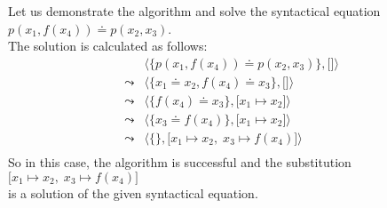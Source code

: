 \example
Let us demonstrate the algorithm and solve the syntactical equation \\[0.2cm]
\hspace*{1.3cm}  $p(x_1, f(x_4)) \doteq p( x_2, x_3)$.  \\[0.2cm]
The solution is calculated as follows:
$$
\begin{array}{ll}
          &  \big\langle \big\{ p(x_1, f(x_4)) \doteq p( x_2, x_3) \big\}, \big[ \big] \big\rangle \\[0.2cm]
 \leadsto &  \big\langle \big\{ x_1 \doteq x_2, f(x_4) \doteq x_3 \big\}, \big[ \big] \big\rangle \\[0.2cm]
 \leadsto &  \big\langle \big\{ f(x_4) \doteq x_3 \big\}, \big[ x_1 \mapsto x_2 \big] \big\rangle \\[0.2cm]
 \leadsto &  \big\langle \big\{ x_3 \doteq f(x_4) \big\}, \big[ x_1 \mapsto x_2 \big] \big\rangle \\[0.2cm]
 \leadsto &  \big\langle \big\{\big\}, \big[ x_1 \mapsto x_2,\; x_3 \mapsto f(x_4) \big] \big\rangle \\[0.2cm]
\end{array}
$$
So in this case, the algorithm is successful and the substitution
 \\[0.2cm]
\hspace*{1.3cm} $\big[ x_1 \mapsto x_2,\; x_3 \mapsto f(x_4) \big]$ \\[0.2cm]
is a solution of the given syntactical equation.  

